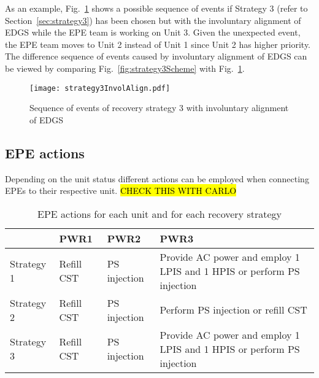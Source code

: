As an example, Fig.~\ref{fig:strategy3SchemeInvolAlign} shows a possible sequence of events if Strategy 3 
(refer to Section~\ref{sec:strategy3}) has been chosen but with the involuntary alignment of EDGS while the EPE team
is working on Unit 3. Given the unexpected event, the EPE team moves to Unit 2 instead of Unit 1 since Unit 2
has higher priority. The difference sequence of events caused by involuntary alignment of EDGS can be viewed
by comparing Fig.~\ref{fig:strategy3Scheme} with Fig.~\ref{fig:strategy3SchemeInvolAlign}.

\begin{figure}
  \centering
  \centerline{\texttt{[image: strategy3InvolAlign.pdf]}}
  \caption{Sequence of events of recovery strategy 3 with involuntary alignment of EDGS}
  \label{fig:strategy3SchemeInvolAlign}
\end{figure}

\subsection{EPE actions}
\label{sec:EPEactions}

Depending on the unit status different actions can be employed when connecting EPEs to their respective unit.
\hl{CHECK THIS WITH CARLO}

\begin{table}
  \begin{tabular}{|l|l|l|p{5cm}|}
     \hline
                 & PWR1       & PWR2         & PWR3                                                                   \\ \hline \hline
     Strategy 1  & Refill CST & PS injection & Provide AC power and employ 1 LPIS and 1 HPIS or perform PS injection  \\ \hline
     Strategy 2  & Refill CST & PS injection & Perform PS injection or refill CST                                     \\ \hline
     Strategy 3  & Refill CST & PS injection & Provide AC power and employ 1 LPIS and 1 HPIS or perform PS injection  \\ \hline
  \end{tabular}
  \caption{EPE actions for each unit and for each recovery strategy}
  \label{fig:EPEactions}
\end{table} 

